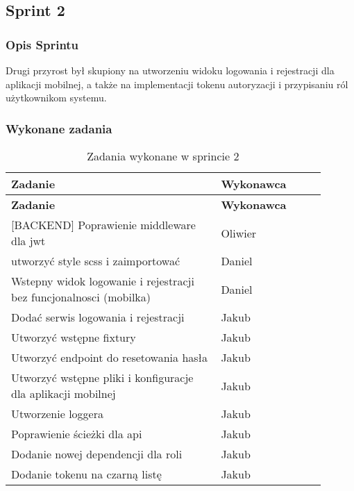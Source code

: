 \subsection{Sprint 2}

\subsubsection{Opis Sprintu}
Drugi przyrost był skupiony na utworzeniu widoku logowania i rejestracji dla aplikacji mobilnej, a także na implementacji tokenu autoryzacji i przypisaniu ról użytkownikom systemu.

\subsubsection{Wykonane zadania}

\begin{longtable}{|p{0.6\linewidth}|p{0.3\linewidth}|}
\hline
\textbf{Zadanie} & \textbf{Wykonawca} \\
\hline
\endfirsthead

\hline
\textbf{Zadanie} & \textbf{Wykonawca} \\
\hline
\endhead

\hline
\endfoot

\hline
\caption{Zadania wykonane w sprincie 2}
\endlastfoot

[BACKEND] Poprawienie middleware dla jwt & Oliwier \\
\hline
[MOBILE] utworzyć style scss i zaimportować & Daniel \\
\hline
[MOBILE] Wstepny widok logowanie i rejestracji bez funcjonalnosci (mobilka) & Daniel \\
\hline
[MOBILE] Dodać serwis logowania i rejestracji & Jakub \\
\hline
[BACKEND] Utworzyć wstępne fixtury & Jakub \\
\hline
[BACKEND] Utworzyć endpoint do resetowania hasła & Jakub \\
\hline
[MOBILE] Utworzyć wstępne pliki i konfiguracje dla aplikacji mobilnej & Jakub \\
\hline
[BACKEND] Utworzenie loggera & Jakub \\
\hline
[BACKEND] Poprawienie ścieżki dla api & Jakub \\
\hline
[BACKEND] Dodanie nowej dependencji dla roli & Jakub \\
\hline
[BACKEND] Dodanie tokenu na czarną listę & Jakub \\
\hline

\end{longtable}

